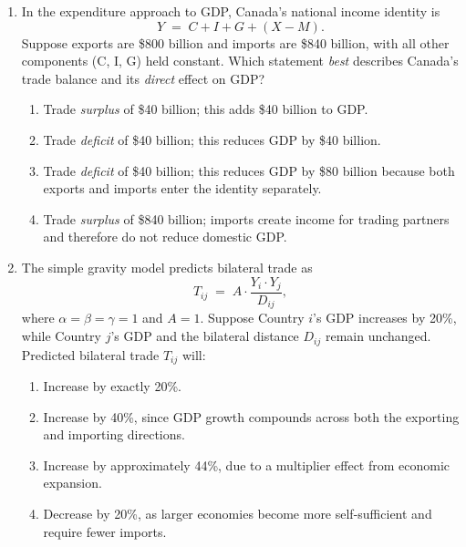 \documentclass[11pt]{article}
\begin{document}
\begin{enumerate}


\item In the expenditure approach to GDP, Canada's national income identity is
\[Y \;=\; C + I + G + (X - M).\]
Suppose exports are \$800 billion and imports are \$840 billion, with all other
components (C, I, G) held constant. Which statement \emph{best} describes
Canada's trade balance and its \emph{direct} effect on GDP?

\medskip
\begin{enumerate}[label=\textbf{\Alph*)},leftmargin=2em,itemsep=0.4em]
  \item Trade \emph{surplus} of \$40 billion; this adds \$40 billion to GDP.
  \item Trade \emph{deficit} of \$40 billion; this reduces GDP by \$40 billion.
  \item Trade \emph{deficit} of \$40 billion; this reduces GDP by \$80 billion
        because both exports and imports enter the identity separately.
  \item Trade \emph{surplus} of \$840 billion; imports create income for trading
        partners and therefore do not reduce domestic GDP.
\end{enumerate}



\bigskip\bigskip

\item The simple gravity model predicts bilateral trade as
\[T_{ij} \;=\; A\cdot\frac{Y_i\cdot Y_j}{D_{ij}},\]
where $\alpha = \beta = \gamma = 1$ and $A = 1$. Suppose Country $i$'s GDP
increases by 20\%, while Country $j$'s GDP and the bilateral distance $D_{ij}$
remain unchanged. Predicted bilateral trade $T_{ij}$ will:

\medskip
\begin{enumerate}[label=\textbf{\Alph*)},leftmargin=2em,itemsep=0.4em]
  \item Increase by exactly 20\%.
  \item Increase by 40\%, since GDP growth compounds across both the exporting
        and importing directions.
  \item Increase by approximately 44\%, due to a multiplier effect from economic
        expansion.
  \item Decrease by 20\%, as larger economies become more self-sufficient and
        require fewer imports.
\end{enumerate}




\end{enumerate}
\end{document}
